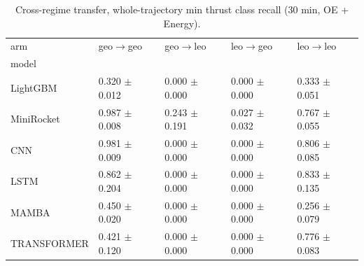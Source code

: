 \begin{table}
\caption{Cross-regime transfer, whole-trajectory min thrust class recall (30 min, OE + Energy).}
\label{tab:total_transfer_minrec}
\begin{tabular}{lllll}
\toprule
arm & geo$\rightarrow$geo & geo$\rightarrow$leo & leo$\rightarrow$geo & leo$\rightarrow$leo \\
model &  &  &  &  \\
\midrule
LightGBM & 0.320 $\pm$ 0.012 & 0.000 $\pm$ 0.000 & 0.000 $\pm$ 0.000 & 0.333 $\pm$ 0.051 \\
MiniRocket & 0.987 $\pm$ 0.008 & 0.243 $\pm$ 0.191 & 0.027 $\pm$ 0.032 & 0.767 $\pm$ 0.055 \\
CNN & 0.981 $\pm$ 0.009 & 0.000 $\pm$ 0.000 & 0.000 $\pm$ 0.000 & 0.806 $\pm$ 0.085 \\
LSTM & 0.862 $\pm$ 0.204 & 0.000 $\pm$ 0.000 & 0.000 $\pm$ 0.000 & 0.833 $\pm$ 0.135 \\
MAMBA & 0.450 $\pm$ 0.020 & 0.000 $\pm$ 0.000 & 0.000 $\pm$ 0.000 & 0.256 $\pm$ 0.079 \\
TRANSFORMER & 0.421 $\pm$ 0.120 & 0.000 $\pm$ 0.000 & 0.000 $\pm$ 0.000 & 0.776 $\pm$ 0.083 \\
\bottomrule
\end{tabular}
\end{table}
